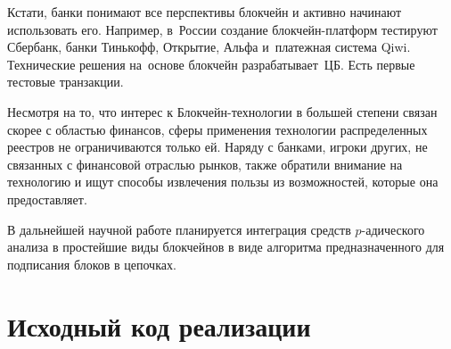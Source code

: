 \documentclass[och, master, nir]{SCWorks_fix}
\theoremstyle{plain}
\theoremstyle{plain}
\theoremstyle{plain}
\theoremstyle{definition}
\begin{document}
Кстати, банки понимают все перспективы блокчейн и активно начинают использовать его. Например, в России создание блокчейн-платформ тестируют Сбербанк, банки Тинькофф, Открытие, Альфа и платежная система Qiwi. Технические решения на основе блокчейн разрабатывает ЦБ. Есть первые тестовые транзакции.

Несмотря на то, что интерес к Блокчейн-технологии в большей степени связан скорее с областью финансов, сферы применения технологии распределенных реестров не ограничиваются только ей. Наряду с банками, игроки других, не связанных с финансовой отраслью рынков, также обратили внимание на технологию и ищут способы извлечения пользы из возможностей, которые она предоставляет.


\conclusion
В дальнейшей научной работе планируется интеграция средств $p$-адического анализа в простейшие виды блокчейнов в виде алгоритма предназначенного для подписания блоков в цепочках.






\appendix
\section{Исходный код реализации}


\end{document}
